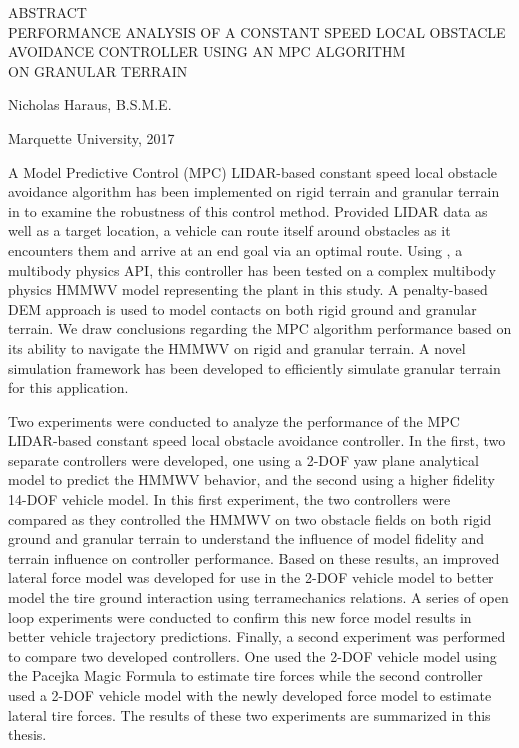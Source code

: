 \documentclass[12pt,onecolumn]{report}
\newcommand{\CHRONO}{{\sffamily{{Chrono}}}}
\begin{document}
\begin{singlespacing}
\begin{center}

ABSTRACT\\
PERFORMANCE ANALYSIS OF A CONSTANT SPEED LOCAL OBSTACLE\\ AVOIDANCE CONTROLLER USING AN MPC ALGORITHM\\ ON GRANULAR TERRAIN\\

\vspace{0.2in}

Nicholas Haraus, B.S.M.E.\\
\vspace{0.1in}

Marquette University, 2017
\end{center}

\vspace{0.2in}

A Model Predictive Control (MPC) LIDAR-based constant speed local obstacle avoidance algorithm has been implemented on rigid terrain and granular terrain in {\CHRONO} to examine the robustness of this control method. Provided LIDAR data as well as a target location, a vehicle can route itself around obstacles as it encounters them and arrive at an end goal via an optimal route. Using {\CHRONO}, a multibody physics API, this controller has been tested on a complex multibody physics HMMWV model representing the plant in this study. A penalty-based DEM approach is used to model contacts on both rigid ground and granular terrain. We draw conclusions regarding the MPC algorithm performance based on its ability to navigate the {\CHRONO} HMMWV on rigid and granular terrain. A novel simulation framework has been developed to efficiently simulate granular terrain for this application.

Two experiments were conducted to analyze the performance of the MPC LIDAR-based constant speed local obstacle avoidance controller. In the first, two separate controllers were developed, one using a 2-DOF yaw plane analytical model to predict the HMMWV behavior, and the second using a higher fidelity 14-DOF vehicle model. In this first experiment, the two controllers were compared as they controlled the HMMWV on two obstacle fields on both rigid ground and granular terrain to understand the influence of model fidelity and terrain influence on controller performance. Based on these results, an improved lateral force model was developed for use in the 2-DOF vehicle model to better model the tire ground interaction using terramechanics relations. A series of open loop experiments were conducted to confirm this new force model results in better vehicle trajectory predictions. Finally, a second experiment was performed to compare two developed controllers. One used the 2-DOF vehicle model using the Pacejka Magic Formula to estimate tire forces while the second controller used a 2-DOF vehicle model with the newly developed force model to estimate lateral tire forces. The results of these two experiments are summarized in this thesis.


\vfill
\end{singlespacing}
\newpage
\end{document}
